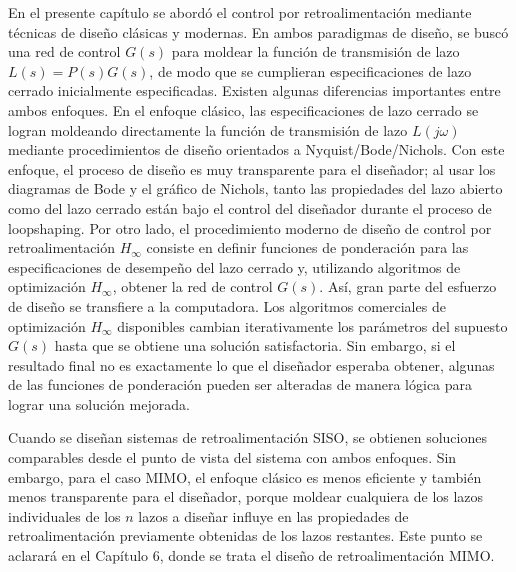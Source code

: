 
En el presente capítulo se abordó el control por retroalimentación mediante técnicas de diseño clásicas y modernas. En ambos paradigmas de diseño, se buscó una red de control \(G(s)\) para moldear la función de transmisión de lazo \(L(s)=P(s)G(s)\), de modo que se cumplieran especificaciones de lazo cerrado inicialmente especificadas. Existen algunas diferencias importantes entre ambos enfoques. En el enfoque clásico, las especificaciones de lazo cerrado se logran moldeando directamente la función de transmisión de lazo \(L(j\omega)\) mediante procedimientos de diseño orientados a Nyquist/Bode/Nichols. Con este enfoque, el proceso de diseño es muy transparente para el diseñador; al usar los diagramas de Bode y el gráfico de Nichols, tanto las propiedades del lazo abierto como del lazo cerrado están bajo el control del diseñador durante el proceso de loopshaping. Por otro lado, el procedimiento moderno de diseño de control por retroalimentación \(H_\infty\) consiste en definir funciones de ponderación para las especificaciones de desempeño del lazo cerrado y, utilizando algoritmos de optimización \(H_\infty\), obtener la red de control \(G(s)\). Así, gran parte del esfuerzo de diseño se transfiere a la computadora. Los algoritmos comerciales de optimización \(H_\infty\) disponibles cambian iterativamente los parámetros del supuesto \(G(s)\) hasta que se obtiene una solución satisfactoria. Sin embargo, si el resultado final no es exactamente lo que el diseñador esperaba obtener, algunas de las funciones de ponderación pueden ser alteradas de manera lógica para lograr una solución mejorada.

Cuando se diseñan sistemas de retroalimentación SISO, se obtienen soluciones comparables desde el punto de vista del sistema con ambos enfoques. Sin embargo, para el caso MIMO, el enfoque clásico es menos eficiente y también menos transparente para el diseñador, porque moldear cualquiera de los lazos individuales de los \(n\) lazos a diseñar influye en las propiedades de retroalimentación previamente obtenidas de los lazos restantes. Este punto se aclarará en el Capítulo 6, donde se trata el diseño de retroalimentación MIMO.

